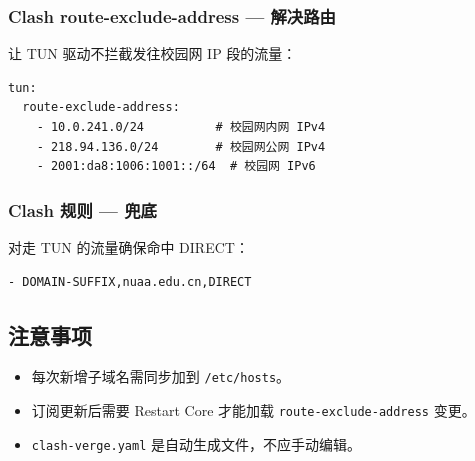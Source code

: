 \subsubsection{Clash route-exclude-address — 解决路由}
让 TUN 驱动不拦截发往校园网 IP 段的流量：
\begin{verbatim}
tun:
  route-exclude-address:
    - 10.0.241.0/24          # 校园网内网 IPv4
    - 218.94.136.0/24        # 校园网公网 IPv4
    - 2001:da8:1006:1001::/64  # 校园网 IPv6
\end{verbatim}

\subsubsection{Clash 规则 — 兜底}
对走 TUN 的流量确保命中 DIRECT：
\begin{verbatim}
- DOMAIN-SUFFIX,nuaa.edu.cn,DIRECT
\end{verbatim}

\subsection{注意事项}
\begin{itemize}
  \item 每次新增子域名需同步加到 \verb|/etc/hosts|。
  \item 订阅更新后需要 Restart Core 才能加载 \verb|route-exclude-address| 变更。
  \item \verb|clash-verge.yaml| 是自动生成文件，不应手动编辑。
\end{itemize}
